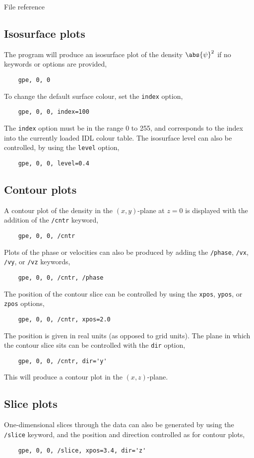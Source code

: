 \begin{chapter}{\label{cha:file_reference}File reference}
  \subsection{Isosurface plots}
  The program will produce an isosurface plot of the density $\abs{\psi}^{2}$
  if no keywords or options are provided, \eg
  \begin{Verbatim}
    gpe, 0, 0
  \end{Verbatim}
  To change the default surface colour, set the \verb"index" option, \eg
  \begin{Verbatim}
    gpe, 0, 0, index=100
  \end{Verbatim}
  The \verb"index" option must be in the range 0 to 255, and corresponds to the
  index into the currently loaded IDL colour table.
  The isosurface level can also be controlled, by using the \verb"level"
  option, \eg
  \begin{Verbatim}
    gpe, 0, 0, level=0.4
  \end{Verbatim}

  \subsection{Contour plots}
  A contour plot of the density in the $(x,y)$-plane at $z=0$ is displayed with
  the addition of the \verb"/cntr" keyword, \eg
  \begin{Verbatim}
    gpe, 0, 0, /cntr
  \end{Verbatim}
  Plots of the phase or velocities can also be produced by adding the
  \verb"/phase", \verb"/vx", \verb"/vy", or \verb"/vz" keywords, \eg
  \begin{Verbatim}
    gpe, 0, 0, /cntr, /phase
  \end{Verbatim}
  The position of the contour slice can be controlled by using the \verb"xpos",
  \verb"ypos", or \verb"zpos" options, \eg
  \begin{Verbatim}
    gpe, 0, 0, /cntr, xpos=2.0
  \end{Verbatim}
  The position is given in real units (as opposed to grid units).
  The plane in which the contour slice sits can be controlled with the
  \verb"dir" option, \eg
  \begin{Verbatim}
    gpe, 0, 0, /cntr, dir='y'
  \end{Verbatim}
  This will produce a contour plot in the $(x,z)$-plane.

  \subsection{Slice plots}
  One-dimensional slices through the data can also be generated by using the
  \verb"/slice" keyword, and the position and direction controlled as for
  contour plots, \eg
  \begin{Verbatim}
    gpe, 0, 0, /slice, xpos=3.4, dir='z'
  \end{Verbatim}


\end{chapter}
